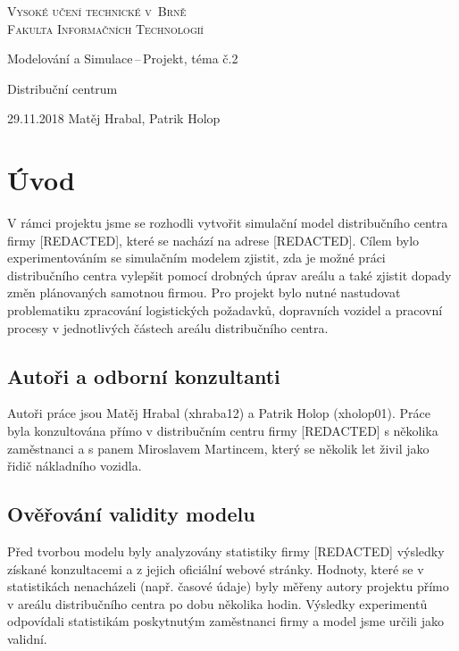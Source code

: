 \documentclass[a4paper, 11pt]{article}
\begin{document}
\newcommand{\myuv}[1]{\quotedblbase #1\textquotedblleft}

\thispagestyle{empty}
\onecolumn
\begin{center}
\Huge
\textsc{Vysoké učení technické v~Brně\\\huge{Fakulta Informačních Technologií}}

\LARGE
{}
Modelování a Simulace\,--\,Projekt, téma č.2

\Huge{Distribuční centrum}
\end{center}
{\LARGE 29.11.2018 \hfill
Matěj Hrabal, Patrik Holop}
\newpage
\setcounter{page}{1}
\section{Úvod}
V rámci projektu jsme se rozhodli vytvořit simulační model\cite[slide 9]{IMS} distribučního centra firmy [REDACTED], které se nachází na adrese [REDACTED]. Cílem bylo experimentováním se simulačním modelem zjistit, zda je možné práci distribučního centra vylepšit pomocí drobných úprav areálu a také zjistit dopady změn plánovaných samotnou firmou. Pro projekt bylo nutné nastudovat problematiku zpracování logistických požadavků, dopravních vozidel a pracovní procesy v jednotlivých částech areálu distribučního centra.
\subsection{Autoři a odborní konzultanti}
Autoři práce jsou Matěj Hrabal (xhraba12) a Patrik Holop (xholop01).
Práce byla konzultována přímo v distribučním centru firmy [REDACTED] s několika zaměstnanci a s panem Miroslavem Martincem, který se několik let živil jako řidič nákladního vozidla.
\subsection{Ověřování validity modelu}
Před tvorbou modelu byly analyzovány statistiky firmy [REDACTED] výsledky získané konzultacemi a z jejich oficiální webové stránky. Hodnoty, které se v statistikách nenacházeli (např. časové údaje) byly měřeny autory projektu přímo v areálu distribučního centra po dobu několika hodin. Výsledky experimentů odpovídali statistikám poskytnutým zaměstnanci firmy a model jsme určili jako validní\cite[slide 37]{IMS}.
\end{document}
